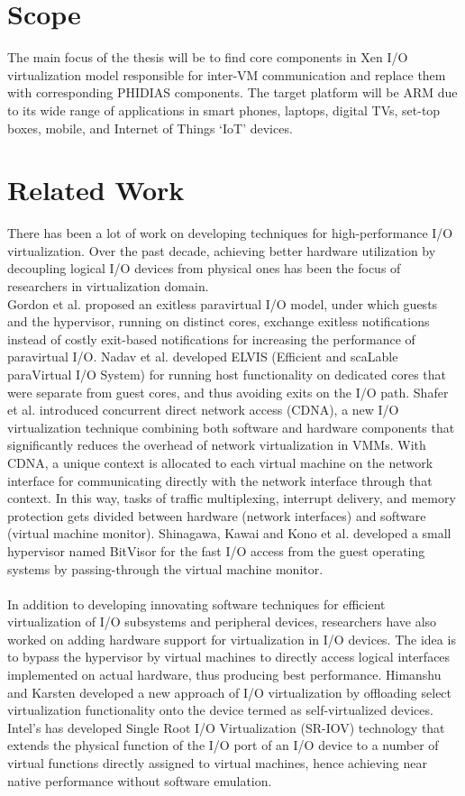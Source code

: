\section{Scope\label{sec:scope}}
The main focus of the thesis will be to find core components in Xen I/O virtualization model responsible for inter-VM communication and replace them with corresponding PHIDIAS components. The target platform will be ARM due to its wide range of applications in smart phones, laptops, digital TVs, set-top boxes, mobile, and Internet of Things `IoT' devices. 


\section{Related Work\label{sec:prework}}
There has been a lot of work on developing techniques for high-performance I/O virtualization. Over the past decade, achieving better hardware utilization by decoupling logical I/O devices from physical ones has been the focus of researchers in virtualization domain.
\\
Gordon et al. \cite{exitless} proposed an exitless paravirtual I/O model, under which guests and the hypervisor, running on distinct cores, exchange exitless notifications instead of costly exit-based notifications for increasing the performance of paravirtual I/O. Nadav et al. \cite{efficient}  developed ELVIS (Efficient and scaLable paraVirtual I/O System) for running host functionality on dedicated cores that were separate from guest cores, and thus avoiding exits on the I/O path. Shafer et al. \cite{CDNA} introduced concurrent direct network access (CDNA), a new I/O virtualization technique combining both software and hardware components that significantly reduces the overhead of network virtualization in VMMs. With CDNA, a unique context is allocated to each virtual machine on the network interface for communicating directly with the network interface through that context. In this way, tasks of traffic multiplexing, interrupt delivery, and memory protection gets divided between hardware (network interfaces) and software (virtual  machine monitor). Shinagawa, Kawai and Kono et al. \cite{bitvisor} developed a small hypervisor named BitVisor for the fast I/O access from the guest operating systems by passing-through the virtual machine monitor.
\\
\\
In addition to developing innovating software techniques for efficient virtualization of I/O subsystems and peripheral devices, researchers have also worked on adding hardware support for virtualization in I/O devices. The idea is to bypass the hypervisor by virtual machines to directly access logical interfaces implemented on actual hardware, thus producing best performance. Himanshu and Karsten \cite{selfvirt} developed a new approach of I/O virtualization by  offloading select virtualization functionality onto the device termed as self-virtualized devices. Intel's has developed Single Root I/O Virtualization (SR-IOV) technology \cite{SRIOC} that extends the physical function of the I/O port of an I/O device to a number of virtual functions directly assigned to virtual machines, hence achieving near native performance without software emulation. 
